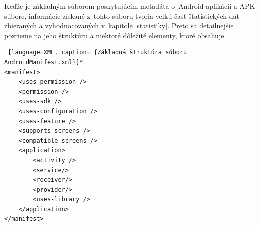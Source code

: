 Keďže  je základným súborom poskytujúcim metadáta o~Android aplikácii a APK súbore, informácie získané z~tohto súboru tvoria veľkú časť štatistických dát zbieraných a vyhodnocovaných v~kapitole \ref{statistiky}. Preto sa detailnejšie pozrieme na jeho štruktúru a niektoré dôležité elementy, ktoré obsahuje.
\begin{lstlisting} [language=XML, caption= {Základná štruktúra súboru AndroidManifest.xml}]*
<manifest>
    <uses-permission />
    <permission />
    <uses-sdk />
    <uses-configuration />  
    <uses-feature />  
    <supports-screens />  
    <compatible-screens />  
    <application>
        <activity />
        <service/>
        <receiver/>
        <provider/>
        <uses-library />
    </application>
</manifest>
\end{lstlisting}

